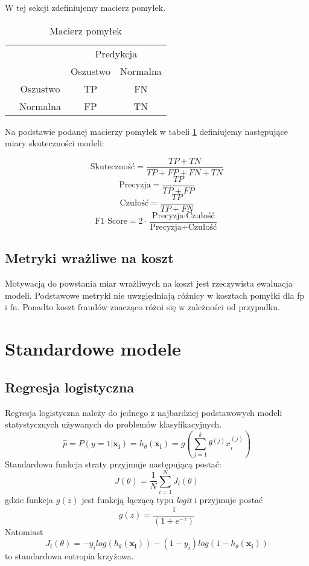 \documentclass{book}
\begin{document}
W tej sekcji zdefiniujemy macierz pomyłek.
\begin{table}[h]
	\begin{center}
		\makegapedcells
		\begin{tabular}{cc|cc}
			\multicolumn{2}{c}{}     &   \multicolumn{2}{c}{Predykcja} \\
			&            &   Oszustwo &   Normalna     \\ 
			\cline{2-4}
			\multirow{2}{*}{\rotatebox[origin=c]{90}{Prawda}} & Oszustwo   & TP         & FN              \\
			& Normalna   & FP         & TN              \\ 
			\cline{2-4}
		\end{tabular}
	\end{center}
	\caption{Macierz pomyłek}
	\label{macierz-pomylek}
\end{table}


Na podstawie podanej macierzy pomyłek w tabeli \ref{macierz-pomylek} definiujemy następujące miary skuteczności modeli:

$$ \text{Skuteczność} = \frac{TP + TN}{TP + FP + FN + TN} $$
$$ \text{Precyzja} = \frac{TP}{TP + FP} $$
$$ \text{Czułość}= \frac{TP}{TP + FN} $$
$$ \text{F1 Score} = 2 \cdot \frac{\text{Precyzja} \cdot \text{Czułość}}{\text{Precyzja} + \text{Czułość}} $$

\subsection{Metryki wrażliwe na koszt}

Motywacją do powstania miar wrażliwych na koszt jest rzeczywista ewaluacja modeli. Podstawowe metryki nie uwzględniają różnicy w kosztach pomyłki dla fp i fn. Ponadto koszt fraudów znacząco różni się w zależności od przypadku.

\section{Standardowe modele}

\subsection{Regresja logistyczna}

	Regresja logistyczna należy do jednego z najbardziej podstawowych modeli statystycznych używanych do problemów klasyfikacyjnych. 
	\begin{equation}
		\hat{p} = P(y=1|\boldsymbol{x_i}) = h_{\theta}(\boldsymbol{x_i}) = g\left(\sum_{j=1}^k \theta^{(j)}x_i^{(j)} \right)
	\end{equation} 
	Standardowa funkcja straty przyjmuje następującą postać:
	$$ J(\theta) = \frac{1}{N} \sum_{i=1}^N J_i(\theta) $$
	gdzie funkcja $g(z)$ jest funkcją łączącą typu \textit{logit} i przyjmuje postać 
	$$ g(z) = \frac{1}{(1+e^{-z})} $$
	Natomiast 
	$$ J_i(\theta) = -y_i log(h_{\theta}(\boldsymbol{x_i})) - (1-y_i) log(1 - h_{\theta}(\boldsymbol{x_i})) $$
	 to standardowa entropia krzyżowa.
\end{document}
